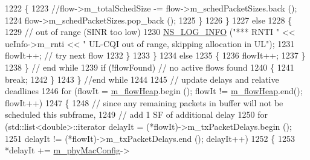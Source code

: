 \begin{DoxyCode}
1222                                                 \{
1223                                                         \textcolor{comment}{//flow->m\_totalSchedSize -=
       flow->m\_schedPacketSizes.back ();}
1224                                                         flow->m\_schedPacketSizes.pop\_back ();
1225                                                 \}
1226                                         \}
1227                                         \textcolor{keywordflow}{else}
1228                                         \{
1229                                                 \textcolor{comment}{// out of range (SINR too low)}
1230                                                 \hyperlink{group__logging_gafbd73ee2cf9f26b319f49086d8e860fb}{NS\_LOG\_INFO} (\textcolor{stringliteral}{"*** RNTI "} << ueInfo->m\_rnti << \textcolor{stringliteral}{"
       UL-CQI out of range, skipping allocation in UL"});
1231                                                 flowIt++; \textcolor{comment}{// try next flow}
1232                                         \}
1233                                 \}
1234                                 \textcolor{keywordflow}{else}
1235                                 \{
1236                                         flowIt++;
1237                                 \}
1238                         \} \textcolor{comment}{// end while}
1239                         \textcolor{keywordflow}{if} (!flowFound) \textcolor{comment}{// no active flows found}
1240                         \{
1241                                 \textcolor{keywordflow}{break};
1242                         \}
1243                 \} \textcolor{comment}{//end while}
1244 
1245                 \textcolor{comment}{// update delays and relative deadlines}
1246                 \textcolor{keywordflow}{for} (flowIt = \hyperlink{classns3_1_1MmWaveFlexTtiMaxWeightMacScheduler_a5914fa5ecbe0fef6968a27a04df53e7b}{m\_flowHeap}.begin (); flowIt != 
      \hyperlink{classns3_1_1MmWaveFlexTtiMaxWeightMacScheduler_a5914fa5ecbe0fef6968a27a04df53e7b}{m\_flowHeap}.end(); flowIt++)
1247                 \{
1248                         \textcolor{comment}{// since any remaining packets in buffer will not be scheduled this subframe,}
1249                         \textcolor{comment}{// add 1 SF of additional delay}
1250                         \textcolor{keywordflow}{for} (std::list<double>::iterator delayIt = (*flowIt)->m\_txPacketDelays.begin ();
1251                                         delayIt != (*flowIt)->m\_txPacketDelays.end (); delayIt++)
1252                         \{
1253                                 *delayIt += \hyperlink{classns3_1_1MmWaveMacScheduler_a24d7af4971d2e500fe543cefbafa2fd9}{m\_phyMacConfig}->

\end{DoxyCode}
